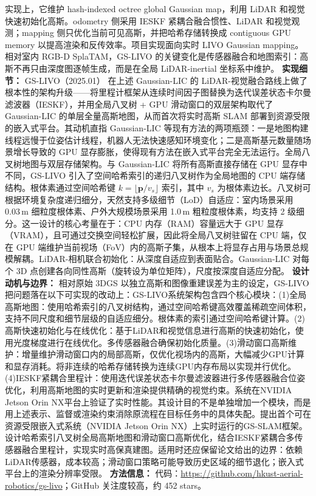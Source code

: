 实现上，它维护 hash-indexed octree global Gaussian map，利用 LiDAR 和视觉快速初始化高斯。odometry 侧采用 IESKF 紧耦合融合惯性、LiDAR 和视觉观测；mapping 侧只优化当前可见高斯，并把哈希存储转换成 contiguous GPU memory 以提高渲染和反传效率。项目实现面向实时 LIVO Gaussian mapping。相对室内 RGB-D SplaTAM，GS-LIVO 的关键变化是传感器融合和地图索引：高斯不再只由深度图逐帧生成，而是在全局 LiDAR-inertial 坐标系中维护。
\textbf{实现细节：} GS-LIVO（2025.01） 在上述 Gaussian-LIC 的 LiDAR-视觉融合路线上做了根本性的架构升级——将里程计框架从连续时间因子图替换为迭代误差状态卡尔曼滤波器（IESKF），并用全局八叉树 + GPU 滑动窗口的双层架构取代了 Gaussian-LIC 的单层全量高斯地图，从而首次将实时高斯 SLAM 部署到资源受限的嵌入式平台。其动机直指 Gaussian-LIC 等现有方法的两项瓶颈：一是地图构建线程远慢于位姿估计线程，机器人无法快速感知环境变化；二是高斯基元数量随场景增长导致的 GPU 显存膨胀，使得现有方法在嵌入式平台完全无法运行。全局八叉树地图与双层存储架构。与 Gaussian-LIC 将所有高斯直接存储在 GPU 显存中不同，GS-LIVO 引入了空间哈希索引的递归八叉树作为全局地图的 CPU 端存储结构。根体素通过空间哈希键 $k = \lfloor \mathbf{p} / v_s \rfloor$ 索引，其中 $v_s$ 为根体素边长。八叉树可根据环境复杂度递归细分，天然支持多级细节（LoD）自适应：室内场景采用 0.03\,m 细粒度根体素、户外大规模场景采用 1.0\,m 粗粒度根体素，均支持 2 级细分。这一设计的核心考量在于：CPU 内存（RAM）容量远大于 GPU 显存（VRAM），且可通过交换空间轻松扩展，因此将全局八叉树驻留在 CPU 端，仅在 GPU 端维护当前视场（FoV）内的高斯子集，从根本上将显存占用与场景总规模解耦。LiDAR-相机联合初始化：从深度自适应到表面贴合。Gaussian-LIC 对每个 3D 点创建各向同性高斯（旋转设为单位矩阵），尺度按深度自适应分配。
\textbf{设计动机与边界：} 相对原始 3DGS 以独立高斯和图像重建误差为主的设定，GS-LIVO 把问题落在以下可实现的改动上：GS-LIVO系统架构包含四个核心模块：(1)全局高斯地图：使用哈希索引的八叉树结构，通过空间哈希键高效覆盖稀疏空间体积，支持不同尺度和细节层级的自适应细分。根体素的索引通过空间哈希键计算。(2)高斯快速初始化与在线优化：基于LiDAR和视觉信息进行高斯的快速初始化，使用光度梯度进行在线优化。多传感器融合确保初始化质量。(3)滑动窗口高斯维护：增量维护滑动窗口内的局部高斯，仅优化视场内的高斯，大幅减少GPU计算和显存消耗。将非连续的哈希存储转换为连续GPU内存布局以实现并行优化。(4)IESKF紧耦合里程计：使用迭代误差状态卡尔曼滤波器进行多传感器融合位姿优化，利用高斯地图的实时更新和渲染提供精确的视觉约束。系统在NVIDIA Jetson Orin NX平台上验证了实时性能。其设计目的不是单独增加一个模块，而是用上述表示、监督或渲染约束消除原流程在目标任务中的具体失配。提出首个可在资源受限嵌入式系统（NVIDIA Jetson Orin NX）上实时运行的GS-SLAM框架。设计哈希索引八叉树全局高斯地图和滑动窗口高斯优化，结合IESKF紧耦合多传感器融合里程计，实现实时高保真建图。适用时还应保留论文给出的边界：依赖LiDAR传感器，成本较高；滑动窗口策略可能导致历史区域的细节退化；嵌入式平台上的渲染分辨率受限。
\textbf{方法信息：} 代码：\url{https://github.com/hkust-aerial-robotics/gs-livo}；GitHub 关注度较高，约 452 stars。




